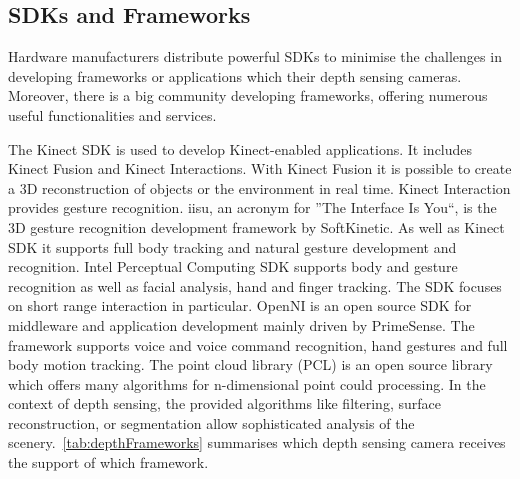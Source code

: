 \subsection*{SDKs and Frameworks}\label{sec:depthSDK}
Hardware manufacturers distribute powerful SDKs to minimise the challenges in developing frameworks or applications which their depth sensing cameras. Moreover, there is a big community developing frameworks, offering numerous useful functionalities and services.

The Kinect SDK is used to develop Kinect-enabled applications. It includes Kinect Fusion and  Kinect Interactions. With Kinect Fusion it is possible to create a 3D reconstruction of objects or the environment in real time. Kinect Interaction provides gesture recognition. iisu, an acronym for ''The Interface Is You``, is the 3D gesture recognition development framework by SoftKinetic. As well as Kinect SDK it supports full body tracking and natural gesture development and recognition. Intel Perceptual Computing SDK supports body and gesture recognition as well as facial analysis, hand and finger tracking. The SDK focuses on short range interaction in particular. \ac{OpenNI} is an open source SDK for middleware and application development mainly driven by PrimeSense. The framework supports voice and voice command recognition, hand gestures and full body motion tracking. The point cloud library (PCL) is an open source library which offers many algorithms for n-dimensional point could processing. In the context of depth sensing, the provided algorithms like filtering, surface reconstruction, or segmentation allow sophisticated analysis of the scenery.~\autoref{tab:depthFrameworks} summarises which depth sensing camera receives the support of which framework.
